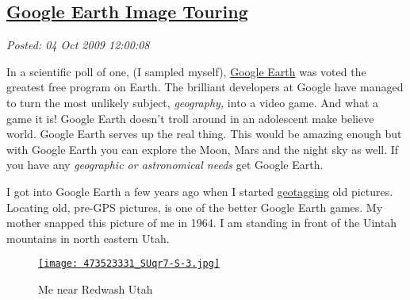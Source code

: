 %

\subsection*{\href{https://bakerjd99.wordpress.com/2009/10/04/google-earth-image-touring/}{Google Earth Image Touring}}


\noindent\emph{Posted: 04 Oct 2009 12:00:08}
\vspace{6pt}

In a scientific poll of one, (I sampled myself),
\href{http://earth.google.com/}{Google Earth} was voted the greatest
free program on Earth. The brilliant developers at Google have managed
to turn the most unlikely subject, \emph{geography,} into a video game.
And what a game it is! Google Earth doesn't troll around in an
adolescent make believe world. Google Earth serves up the real thing.
This would be amazing enough but with Google Earth you can explore the
Moon, Mars and the night sky as well. If you have any \emph{geographic
or astronomical needs} get Google Earth.

I got into Google Earth a few years ago when I started
\href{http://en.wikipedia.org/wiki/Geotagging}{geotagging} old pictures.
Locating old, pre-GPS pictures, is one of the better Google Earth games.
My mother snapped this picture of me in 1964. I am standing in front of
the Uintah mountains in north eastern Utah.


\captionsetup[figure]{labelformat=empty}
\begin{figure}[htbp]
\centering
\href{http://conceptcontrol.smugmug.com/People/The-Way-We-Were/7056082\_f3XX5\#473523331\_SUqr7}{\texttt{[image: 473523331\_SUqr7-S-3.jpg]}}
\caption{Me near  Redwash  Utah}
\label{fig:119X0}
\end{figure}



